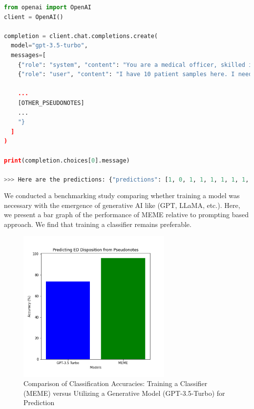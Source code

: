 \documentclass{article}
\theoremstyle{plain}
\theoremstyle{definition}
\theoremstyle{remark}
\begin{document}
\begin{lstlisting}[language=Python, caption=Basic Example of How prompted the gpt-3.5-turbo model to generate predictions.]
from openai import OpenAI
client = OpenAI()

completion = client.chat.completions.create(
  model="gpt-3.5-turbo",
  messages=[
    {"role": "system", "content": "You are a medical officer, skilled in determining whether a patient should be admitted to the Emergency Room or not."},
    {"role": "user", "content": "I have 10 patient samples here. I need you to predict whether each patient should be admitted to the emergency room or not. Give you prediction in the list format ([`1,0,0,1,1,1,0,1,0,1']) and predict 1 if they should be admitted and 0 if not:\n\n'Patient 10000032, a 52 year old white female, arrived via ambulance at 2180-05-06 19:17:00. The patient's marital status is widowed. The patient's insurance is other. The patient's language is english.The patient received the following diagnostic codes: ICD-9 code: [5728], oth sequela, chr liv dis. ICD-9 code: [78959], other ascites. ICD-9 code: [07070], unspecified viral hepatitis c without hepatic coma. ICD-9 code: [v08]...'

    ...
    [OTHER_PSEUDONOTES]
    ...
    "}
  ]
)

print(completion.choices[0].message)

>>> Here are the predictions: {"predictions": [1, 0, 1, 1, 1, 1, 1, 1, 1, 1]}
\end{lstlisting}

We conducted a benchmarking study comparing whether training a model was necessary with the emergence of generative AI like (GPT, LLaMA, etc.). Here, we present a bar graph of the performance of MEME relative to prompting based approach. We find that training a classifier remains preferable.

\begin{figure}[h!]
    \centering
    \includegraphics[width=3in]{plots/dispo.png}
    \caption{Comparison of Classification Accuracies: Training a Classifier (MEME) versus Utilizing a Generative Model (GPT-3.5-Turbo) for Prediction}
    \label{gpt-meme}
\end{figure}
\end{document}
